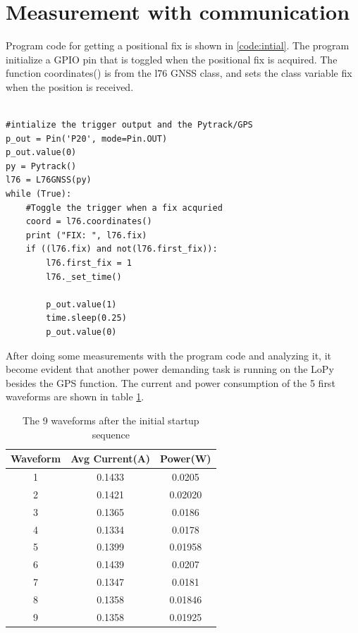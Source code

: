 \section{Measurement with communication}
Program code for getting a positional fix is shown in \ref{code:intial}. The program initialize a GPIO pin that is toggled when the positional fix is acquired. The function coordinates() is from the l76 GNSS class, and sets the class variable fix when the position is received. 
\lstset{language=Python}          %
\begin{lstlisting}[frame=single,caption = main.py]  % Start your code-block

#intialize the trigger output and the Pytrack/GPS
p_out = Pin('P20', mode=Pin.OUT)
p_out.value(0)
py = Pytrack()
l76 = L76GNSS(py)
while (True):
    #Toggle the trigger when a fix acquried
    coord = l76.coordinates()
    print ("FIX: ", l76.fix)
    if ((l76.fix) and not(l76.first_fix)):
        l76.first_fix = 1
        l76._set_time()

        p_out.value(1)
        time.sleep(0.25)
        p_out.value(0)
\end{lstlisting}
\label{code:intial}
After doing some measurements with the program code and analyzing it, it become evident that another power demanding task is running on the LoPy besides the GPS function. The current and power consumption of the 5 first waveforms are shown in table \ref{Table:WIFI_ON}.
\begin{table}[h!]
\begin{center}
 \begin{tabular}{||c c c||} 
 \hline
 Waveform & Avg Current(A) & Power(W)\\ [0.5ex] 
 \hline\hline
 1 & 0.1433    & 0.0205 \\ 
 \hline
 2 & 0.1421    & 0.02020 \\
 \hline
 3 & 0.1365  & 0.0186 \\
 \hline
 4 & 0.1334  & 0.0178 \\
 \hline
 5 & 0.1399  & 0.01958 \\ 
 \hline
 \rowcolor{red}
 6 & 0.1439    & 0.0207 \\ 
 \hline
 7 & 0.1347  & 0.0181 \\
 \hline
 8 & 0.1358  & 0.01846 \\
 \hline
 9 & 0.1358    & 0.01925 \\[1ex]
 \hline
\end{tabular}
\end{center}
\caption{The 9 waveforms after the initial startup sequence}
\label{Table:WIFI_ON}
\end{table}


